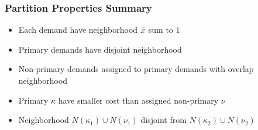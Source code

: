 \documentclass[handout, hyperref, dvipsnames]{beamer}
\begin{document}
\begin{frame}
  \frametitle{Partition Properties Summary}
  \begin{itemize}
    \addtolength{\itemsep}{1\baselineskip}
  \item \large{Each demand have neighborhood ${\bar x}$ sum to $1$}
  \item \large{Primary demands have disjoint neighborhood}
  \item \large{Non-primary demands assigned to primary demands with overlap neighborhood}
  \item \large{Primary $\kappa$ have smaller cost than assigned non-primary $\nu$}
  \item \large{Neighborhood $N(\kappa_1) \cup N(\nu_1)$ disjoint from $N(\kappa_2) \cup N(\nu_2)$}
  \end{itemize}
\end{frame}
\end{document}
